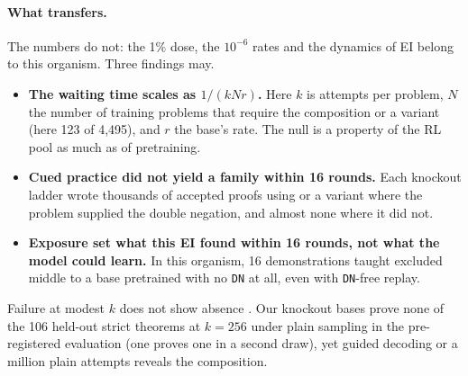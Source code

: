 \paragraph{What transfers.} The numbers do not: the 1\% dose, the $10^{-6}$ rates and the dynamics of EI belong to
this organism. Three findings may.
\begin{itemize}
\item \textbf{The waiting time scales as $1/(kNr)$.} Here $k$ is attempts per problem, $N$ the number of training
problems that require the composition or a variant (here 123 of 4,495), and $r$ the base's rate. The null is a property of the RL pool
as much as of pretraining.
\item \textbf{Cued practice did not yield a family within 16 rounds.} Each knockout ladder wrote thousands of
accepted proofs using \sig{} or a variant where the problem supplied the double negation, and almost none where it did
not.
\item \textbf{Exposure set what this EI found within 16 rounds, not what the model could learn.} In this organism,
16 demonstrations taught excluded middle to a base pretrained with no \texttt{DN} at all, even with \texttt{DN}-free
replay.
\end{itemize}
Failure at modest $k$ does not show absence \citep{brown2024monkeys,hofstatter2025elicitation}. Our knockout bases prove
none of the 106 held-out strict theorems at $k=256$ under plain sampling in the pre-registered evaluation (one proves
one in a second draw), yet guided decoding or a million plain attempts reveals the composition.
